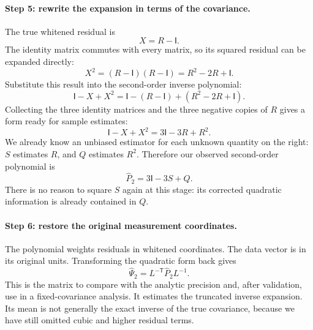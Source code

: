 \documentclass[11pt]{article}
\newcommand{\I}{\mathsf{I}}
\begin{document}
\paragraph{Step 5: rewrite the expansion in terms of the covariance.}
The true whitened residual is
\begin{equation}
 X=R-\I.
\end{equation}
The identity matrix commutes with every matrix, so its squared residual
can be expanded directly:
\begin{equation}
 X^2=(R-\I)(R-\I)=R^2-2R+\I.
\end{equation}
Substitute this result into the second-order inverse polynomial:
\begin{equation}
 \I-X+X^2=\I-(R-\I)+(R^2-2R+\I).
\end{equation}
Collecting the three identity matrices and the three negative copies of
$R$ gives a form ready for sample estimates:
\begin{equation}
 \I-X+X^2=3\I-3R+R^2.
\end{equation}
We already know an unbiased estimator for each unknown quantity on the
right: $S$ estimates $R$, and $Q$ estimates $R^2$. Therefore our observed
second-order polynomial is
\begin{equation}
 \widehat P_2=3\I-3S+Q.
 \label{eq:P2-recipe}
\end{equation}
There is no reason to square $S$ again at this stage: its corrected
quadratic information is already contained in $Q$.

\paragraph{Step 6: restore the original measurement coordinates.}
The polynomial weights residuals in whitened coordinates. The data vector
is in its original units. Transforming the quadratic form back gives
\begin{equation}
 \widehat\Psi_2=L^{-\mathsf T}\widehat P_2L^{-1}.
 \label{eq:restore-P2}
\end{equation}
This is the matrix to compare with the analytic precision and, after
validation, use in a fixed-covariance analysis. It estimates the truncated
inverse expansion. Its mean is not generally the exact inverse of the
true covariance, because we have still omitted cubic and higher residual
terms.
\end{document}
